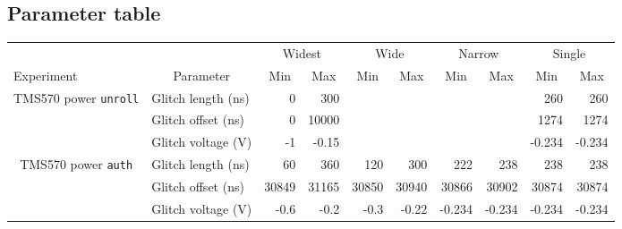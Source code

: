 \documentclass[10pt]{article}
\newcommand{\TI}{TMS570\xspace}
\newcommand{\unroll}{\texttt{unroll}\xspace}
\newcommand{\auth}{\texttt{auth}\xspace}
\begin{document}
\begin{appendices}
  \newpage

  \section{Parameter table}
  \label{apdx:parameters}

  \begin{table}[H]
    \centering
    \begin{tabular}{ll rr rr rr rr}
    \toprule

      &  & \multicolumn{2}{c}{Widest }     &    
           \multicolumn{2}{c}{Wide }      &    
           \multicolumn{2}{c}{Narrow }   &
           \multicolumn{2}{c}{Single }  \\
           \cmidrule(lr){3-4}                    
           \cmidrule(lr){5-6}
           \cmidrule(lr){7-8}
           \cmidrule(l){9-10}
      Experiment & \multicolumn{1}{c}{Parameter}  & 
      \multicolumn{1}{c}{Min}        & \multicolumn{1}{c}{Max}          & 
      \multicolumn{1}{c}{Min}        & \multicolumn{1}{c}{Max}          & 
      \multicolumn{1}{c}{Min}        & \multicolumn{1}{c}{Max}          & 
      \multicolumn{1}{c}{Min}        & \multicolumn{1}{c}{Max}          \\

    \midrule

    \multicolumn{1}{c}{\multirow{3}{*}{ \parbox{2cm}{\TI power \unroll}}}
      & Glitch length (ns)   
      & 0         & 300       
      &           &          
      &           &          
      & 260       & 260      
      \\
      \cmidrule(l){2-10}
      & Glitch offset (ns)   
      & 0         & 10000    
      &           &          
      &           &          
      & 1274      & 1274     
      \\ 
      \cmidrule(l){2-10}
      & Glitch voltage (V) 
      & -1        & -0.15    
      &           &          
      &           &          
      & -0.234    & -0.234   
      \\

    \midrule

    \multicolumn{1}{c}{\multirow{3}{*}{ \parbox{2cm}{\TI power \auth}}}
      & Glitch length (ns)   
      & 60      & 360      
      & 120     & 300      
      & 222     & 238      
      & 238     & 238        
      \\
      \cmidrule(l){2-10}
      & Glitch offset (ns)   
      & 30849   & 31165    
      & 30850   & 30940    
      & 30866   & 30902    
      & 30874   & 30874      
      \\ 
      \cmidrule(l){2-10}
      & Glitch voltage (V) 
      & -0.6      & -0.2   
      &-0.3       & -0.22  
      &-0.234     & -0.234 
      &-0.234     & -0.234   
     \\


\end{tabular}
\end{table}
\end{appendices}
\end{document}
